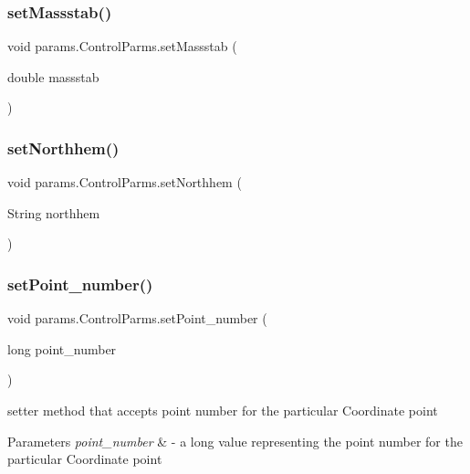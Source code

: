 \subsubsection{\texorpdfstring{set\+Massstab()}{setMassstab()}}
{\footnotesize\ttfamily void params.\+Control\+Parms.\+set\+Massstab (\begin{DoxyParamCaption}\item[{double}]{massstab }\end{DoxyParamCaption})}

\mbox{\label{classparams_1_1_control_parms_a58f9db5f3fc7cfae594313291bc3b4e3}} 
\subsubsection{\texorpdfstring{set\+Northhem()}{setNorthhem()}}
{\footnotesize\ttfamily void params.\+Control\+Parms.\+set\+Northhem (\begin{DoxyParamCaption}\item[{String}]{northhem }\end{DoxyParamCaption})}

\mbox{\label{classparams_1_1_control_parms_a28dd663a60ecea831af1955e43155f49}} 
\subsubsection{\texorpdfstring{set\+Point\+\_\+number()}{setPoint\_number()}}
{\footnotesize\ttfamily void params.\+Control\+Parms.\+set\+Point\+\_\+number (\begin{DoxyParamCaption}\item[{long}]{point\+\_\+number }\end{DoxyParamCaption})}



setter method that accepts point number for the particular Coordinate point 


\begin{DoxyParams}{Parameters}
{\em point\+\_\+number} & -\/ a long value representing the point number for the particular Coordinate point \\
\hline
\end{DoxyParams}
\mbox{\label{classparams_1_1_control_parms_a801da8ace900553603da73d988c16ea6}} 
